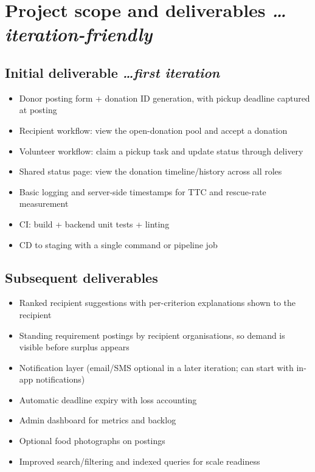 \documentclass[11pt,a4paper]{article}
\newcommand{\BvrHint}[1]{%
  {\normalfont\normalsize\itshape\hfill #1}}
\begin{document}
\section{Project scope and deliverables %
\BvrHint{\ldots iteration-friendly}}
\subsection{Initial deliverable %
\BvrHint{\ldots first iteration}}
\begin{itemize}[leftmargin=0.7cm]
    \item Donor posting form + donation ID generation, with pickup deadline captured at posting
    \item Recipient workflow: view the open-donation pool and accept a donation
    \item Volunteer workflow: claim a pickup task and update status through delivery
    \item Shared status page: view the donation timeline/history across all roles
    \item Basic logging and server-side timestamps for TTC and rescue-rate measurement
    \item CI: build + backend unit tests + linting
    \item CD to staging with a single command or pipeline job
\end{itemize}

\subsection{Subsequent deliverables}
\begin{itemize}[leftmargin=0.7cm]
    \item Ranked recipient suggestions with per-criterion explanations shown to the recipient
    \item Standing requirement postings by recipient organisations, so demand is visible before surplus appears
    \item Notification layer (email/SMS optional in a later iteration; can start with in-app notifications)
    \item Automatic deadline expiry with loss accounting
    \item Admin dashboard for metrics and backlog
    \item Optional food photographs on postings
    \item Improved search/filtering and indexed queries for scale readiness
\end{itemize}
\end{document}
